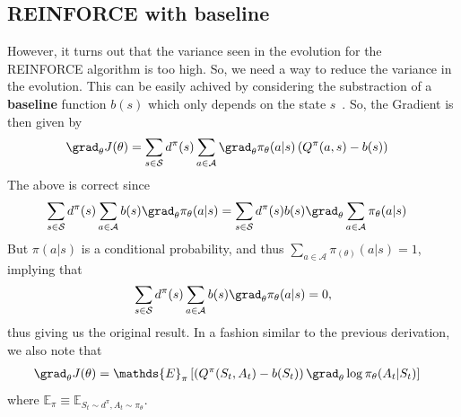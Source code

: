 \subsection{REINFORCE with baseline}
However, it turns out that the variance seen in the evolution for the REINFORCE algorithm is too high. So, we need a way to reduce the variance in the evolution. This can be easily achived by considering the substraction of a \textbf{baseline} function $b(s)$ which only depends on the state $s$~\cite{Sutton:Intro_to_RL_second_ed}. So, the Gradient is then given by 
\begin{align}
    \grad_{\theta} J(\theta) &= \sum_{s\in \mathcal{S}} d^{\pi}(s) \sum_{a \in \mathcal{A}}\grad_{\theta} \pi_{\theta}(a|s) \left(Q^{\pi}(a,s)-b(s) \right)
\end{align}
The above is correct since 
\begin{align}
    \sum_{s\in \mathcal{S}} d^{\pi}(s) \sum_{a \in \mathcal{A}}b(s) \grad_{\theta} \pi_{\theta}(a|s)  &= \sum_{s\in \mathcal{S}} d^{\pi}(s) b(s)\grad_{\theta} \sum_{a \in \mathcal{A}} \pi_{\theta}(a|s) 
\end{align}
But $\pi(a|s)$ is a conditional probability, and thus $\sum_{a\in \mathcal{A}} \pi_(\theta)(a|s) = 1$, implying that 
\begin{align}
    \sum_{s\in \mathcal{S}} d^{\pi}(s) \sum_{a \in \mathcal{A}}b(s) \grad_{\theta} \pi_{\theta}(a|s)  = 0,
\end{align}
thus giving us the original result. In a fashion similar to the previous derivation, we also note that 
\begin{align}
    \grad_{\theta} J(\theta) &=  \mathds{E}_{\pi}\left[\left(Q^{\pi}(S_t,A_t)- b(S_t)\right) \grad_{\theta} \log{\pi_\theta(A_t|S_t)} \right]
\end{align}
where $\mathds{E}_{\pi} \equiv \mathds{E}_{S_t \sim d^{\pi},A_{t}\sim \pi_{\theta}}$. 

